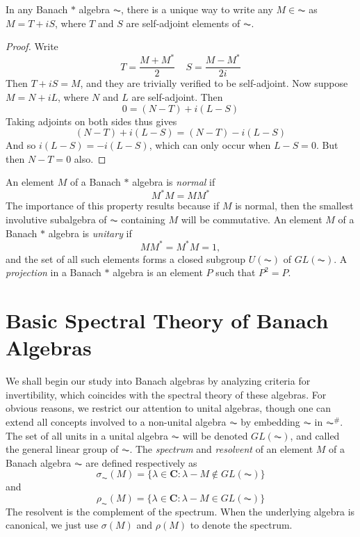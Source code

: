\begin{prop}
    In any Banach $*$ algebra $\AC$, there is a unique way to write any $M \in \AC$ as $M = T + iS$, where $T$ and $S$ are self-adjoint elements of $\AC$.
\end{prop}
\begin{proof}
    Write
    \[ T = \frac{M + M^*}{2}\ \ \ \ \ S = \frac{M - M^*}{2i} \]
    Then $T + iS = M$, and they are trivially verified to be self-adjoint. Now suppose $M = N + iL$, where $N$ and $L$ are self-adjoint. Then
    \[ 0 = (N - T) + i(L - S) \]
    Taking adjoints on both sides thus gives
    \[ (N - T) + i(L - S) = (N - T) - i(L - S) \]
    And so $i(L - S) = -i(L - S)$, which can only occur when $L - S = 0$. But then $N - T = 0$ also.
\end{proof}

An element $M$ of a Banach $*$ algebra is \emph{normal} if
%
\[ M^* M = MM^* \]
%
The importance of this property results because if $M$ is normal, then the smallest involutive subalgebra of $\AC$ containing $M$ will be commutative. An element $M$ of a Banach $*$ algebra is \emph{unitary} if
%
\[ MM^* = M^*M = 1, \]
%
and the set of all such elements forms a closed subgroup $U(\AC)$ of $GL(\AC)$. A \emph{projection} in a Banach $*$ algebra is an element $P$ such that $P^2 = P$.






\chapter{Basic Spectral Theory of Banach Algebras}

We shall begin our study into Banach algebras by analyzing criteria for invertibility, which coincides with the spectral theory of these algebras. For obvious reasons, we restrict our attention to unital algebras, though one can extend all concepts involved to a non-unital algebra $\AC$ by embedding $\AC$ in $\AC^\#$. The set of all units in a unital algebra $\AC$ will be denoted $GL(\AC)$, and called the general linear group of $\AC$. The \emph{spectrum} and \emph{resolvent} of an element $M$ of a Banach algebra $\AC$ are defined respectively as
%
\[ \sigma_{\AC}(M) = \{ \lambda \in \mathbf{C} : \lambda - M \not \in GL(\AC) \} \]
%
and
%
\[ \rho_{\AC}(M) = \{ \lambda \in \mathbf{C} : \lambda - M \in GL(\AC) \} \]
%
The resolvent is the complement of the spectrum. When the underlying algebra is canonical, we just use $\sigma(M)$ and $\rho(M)$ to denote the spectrum. %


